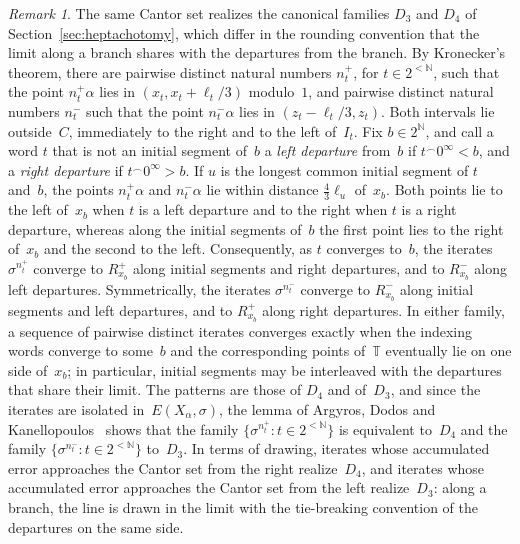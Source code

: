 \documentclass[psamsfonts]{amsart}
\theoremstyle{definition}
\theoremstyle{remark}
\newtheorem{rem}[thm]{Remark}
\numberwithin{equation}{section}
\begin{document}
\begin{rem}\label{rem:Bresenham-D3D4}
The same Cantor set realizes the canonical families $D_3$ and $D_4$ of Section~\ref{sec:heptachotomy}, which differ in the rounding convention that the limit along a branch shares with the departures from the branch.
By Kronecker's theorem, there are pairwise distinct natural numbers $n_t^+$, for $t\in2^{<\mathbb{N}}$, such that the point $n_t^+\alpha$ lies in $(x_t,x_t+\ell_t/3)$ modulo~$1$, and pairwise distinct natural numbers $n_t^-$ such that the point $n_t^-\alpha$ lies in $(z_t-\ell_t/3,z_t)$.
Both intervals lie outside~$C$, immediately to the right and to the left of~$I_t$.
Fix $b\in2^{\mathbb{N}}$, and call a word $t$ that is not an initial segment of~$b$ a \emph{left departure} from~$b$ if $t^\frown0^\infty<b$, and a \emph{right departure} if $t^\frown0^\infty>b$.
If $u$ is the longest common initial segment of $t$ and~$b$, the points $n_t^+\alpha$ and $n_t^-\alpha$ lie within distance $\frac43\ell_u$ of~$x_b$.
Both points lie to the left of~$x_b$ when $t$ is a left departure and to the right when $t$ is a right departure, whereas along the initial segments of~$b$ the first point lies to the right of~$x_b$ and the second to the left.
Consequently, as $t$ converges to~$b$, the iterates $\sigma^{n_t^+}$ converge to $R^+_{x_b}$ along initial segments and right departures, and to $R^-_{x_b}$ along left departures.
Symmetrically, the iterates $\sigma^{n_t^-}$ converge to $R^-_{x_b}$ along initial segments and left departures, and to $R^+_{x_b}$ along right departures.
In either family, a sequence of pairwise distinct iterates converges exactly when the indexing words converge to some~$b$ and the corresponding points of~$\mathbb{T}$ eventually lie on one side of~$x_b$; in particular, initial segments may be interleaved with the departures that share their limit.
The patterns are those of $D_4$ and of~$D_3$, and since the iterates are isolated in~$E(X_\alpha,\sigma)$, the lemma of Argyros, Dodos and Kanellopoulos~\cite[Lemma~19]{argyros2008rosenthal} shows that the family $\{\sigma^{n_t^+}:t\in2^{<\mathbb{N}}\}$ is equivalent to~$D_4$ and the family $\{\sigma^{n_t^-}:t\in2^{<\mathbb{N}}\}$ to~$D_3$.
In terms of drawing, iterates whose accumulated error approaches the Cantor set from the right realize~$D_4$, and iterates whose accumulated error approaches the Cantor set from the left realize~$D_3$: along a branch, the line is drawn in the limit with the tie-breaking convention of the departures on the same side.
\end{rem}
\end{document}
